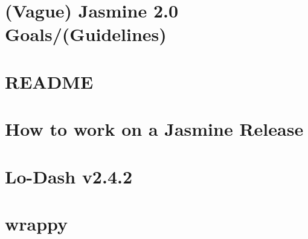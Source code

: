 \documentclass[twoside]{book}
\newcommand{\+}{\discretionary{\mbox{\scriptsize$\hookleftarrow$}}{}{}}
\begin{document}
\chapter{(Vague) Jasmine 2.0 Goals/(Guidelines)}
\label{md__c_1__users_martin__documents__git_hub_visual_studio__bachelor__wis_r__wis_r_node_modules_gru53230257ce08afbcd2cb7f7df398c20a}
\hypertarget{md__c_1__users_martin__documents__git_hub_visual_studio__bachelor__wis_r__wis_r_node_modules_gru53230257ce08afbcd2cb7f7df398c20a}{}

\chapter{R\+E\+A\+D\+M\+E}
\label{md__c_1__users_martin__documents__git_hub_visual_studio__bachelor__wis_r__wis_r_node_modules_gru86a9d7aaca77c4da2803e355812e37f2}
\hypertarget{md__c_1__users_martin__documents__git_hub_visual_studio__bachelor__wis_r__wis_r_node_modules_gru86a9d7aaca77c4da2803e355812e37f2}{}

\chapter{How to work on a Jasmine Release}
\label{md__c_1__users_martin__documents__git_hub_visual_studio__bachelor__wis_r__wis_r_node_modules_gru8e31a769e33a79aedba2c5e390b2189e}
\hypertarget{md__c_1__users_martin__documents__git_hub_visual_studio__bachelor__wis_r__wis_r_node_modules_gru8e31a769e33a79aedba2c5e390b2189e}{}

\chapter{Lo-\/\+Dash v2.4.2}
\label{md__c_1__users_martin__documents__git_hub_visual_studio__bachelor__wis_r__wis_r_node_modules_grub15237775ac9725c3cb5adcbfe623f88}
\hypertarget{md__c_1__users_martin__documents__git_hub_visual_studio__bachelor__wis_r__wis_r_node_modules_grub15237775ac9725c3cb5adcbfe623f88}{}

\chapter{wrappy}
\label{md__c_1__users_martin__documents__git_hub_visual_studio__bachelor__wis_r__wis_r_node_modules_grube839061ffb81d06b27ad7da69b484f1}
\hypertarget{md__c_1__users_martin__documents__git_hub_visual_studio__bachelor__wis_r__wis_r_node_modules_grube839061ffb81d06b27ad7da69b484f1}{}

\end{document}
